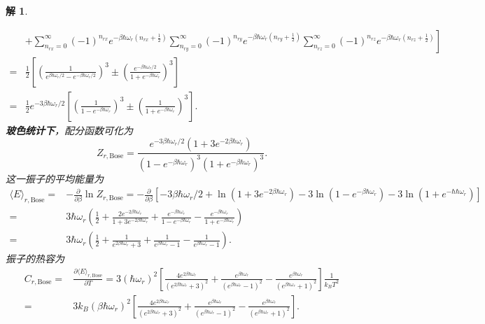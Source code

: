 \documentclass[UTF8,10pt,a4paper]{article}
\theoremstyle{Problem}
\theoremstyle{Solution}
\newtheorem*{sol}{解}
\begin{document}
\begin{sol}
\begin{itemize}
\begin{align}
            \nonumber&\left.+\sum_{n_{rx}=0}^{\infty}(-1)^{n_{rx}}e^{-\beta\hbar\omega_r\left(n_{rx}+\frac{1}{2}\right)}\sum_{n_{ry}=0}^{\infty}(-1)^{n_{ry}}e^{-\beta\hbar\omega_r\left(n_{ry}+\frac{1}{2}\right)}\sum_{n_{rz}=0}^{\infty}(-1)^{n_{rz}}e^{-\beta\hbar\omega_r\left(n_{rz}+\frac{1}{2}\right)}\right]\\
            \nonumber=&\frac{1}{2}\left[\left(\frac{1}{e^{\beta\hbar\omega_r/2}-e^{-\beta\hbar\omega_r/2}}\right)^3\pm\left(\frac{e^{-\beta\hbar\omega_r/2}}{1+e^{-\beta\hbar\omega_r}}\right)^3\right]\\
            =&\frac{1}{2}e^{-3\beta\hbar\omega_r/2}\left[\left(\frac{1}{1-e^{-\beta\hbar\omega_r}}\right)^3\pm\left(\frac{1}{1+e^{-\beta\hbar\omega_r}}\right)^3\right].
        \end{align}
        \textbf{玻色统计下}，配分函数可化为
        \begin{equation}
            Z_{r,\text{Bose}}=\frac{e^{-3\beta\hbar\omega_r/2}(1+3e^{-2\beta\hbar\omega_r})}{(1-e^{-\beta\hbar\omega_r})^3(1+e^{-\beta\hbar\omega_r})^3}.
        \end{equation}
        这一振子的平均能量为
        \begin{align}
            \nonumber\langle E\rangle_{r,\text{Bose}}=&-\frac{\partial}{\partial\beta}\ln Z_{r,\text{Bose}}=-\frac{\partial}{\partial\beta}\left[-3\beta\hbar\omega_r/2+\ln(1+3e^{-2\beta\hbar\omega_r})-3\ln(1-e^{-\beta\hbar\omega_r})-3\ln(1+e^{-\hbar\hbar\omega_r})\right]\\
            \nonumber=&3\hbar\omega_r\left(\frac{1}{2}+\frac{2e^{-2\beta\hbar\omega_r}}{1+3e^{-2\beta\hbar\omega_r}}+\frac{e^{-\beta\hbar\omega_r}}{1-e^{-\beta\hbar\omega_r}}-\frac{e^{-\beta\hbar\omega_r}}{1+e^{-\beta\hbar\omega_r}}\right)\\
            =&3\hbar\omega_r\left(\frac{1}{2}+\frac{1}{e^{2\beta\hbar\omega_r}+3}+\frac{1}{e^{\beta\hbar\omega_r}-1}-\frac{1}{e^{\beta\hbar\omega_r}-1}\right).
        \end{align}
        振子的热容为
        \begin{align}
            \nonumber C_{r,\text{Bose}}=&\frac{\partial\langle E\rangle_{r,\text{Bose}}}{\partial T}=3\left(\hbar\omega_r\right)^2\left[\frac{4e^{2\beta\hbar\omega_r}}{(e^{2\beta\hbar\omega_r}+3)^2}+\frac{e^{\beta\hbar\omega_r}}{(e^{\beta\hbar\omega_r}-1)^2}-\frac{e^{\beta\hbar\omega_r}}{(e^{\beta\hbar\omega_r}+1)^2}\right]\frac{1}{k_BT^2}\\
            =&3k_B\left(\beta\hbar\omega_r\right)^2\left[\frac{4e^{2\beta\hbar\omega_r}}{(e^{2\beta\hbar\omega_r}+3)^2}+\frac{e^{\beta\hbar\omega_r}}{(e^{\beta\hbar\omega_r}-1)^2}-\frac{e^{\beta\hbar\omega_r}}{(e^{\beta\hbar\omega_r}+1)^2}\right].

\end{align}
\end{itemize}
\end{sol}
\end{document}
